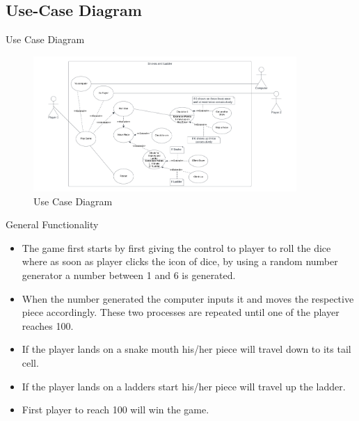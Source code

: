 \documentclass{beamer}
\begin{document}
\subsection{Use-Case Diagram}
\begin{frame}{Use Case Diagram}
    \begin{figure}
        \centering
        \includegraphics[width = 10cm]{images/Use Case.png}
        \caption{Use Case Diagram}
    \end{figure}
\end{frame}
\begin{frame}{General Functionality}
    \begin{itemize}
        \item The game first starts by first giving the control to player to roll the dice where as soon as player clicks the icon of dice, by using a random number generator a number between 1 and 6 is generated.
        \item When the number generated the computer inputs it and moves the respective piece accordingly. These two processes are repeated until one of the player reaches 100.
        \item If the player lands on a snake mouth his/her piece will travel down to its tail cell.
        \item If the player lands on a ladders start his/her piece will travel up the ladder.
        \item First player to reach 100 will win the game.
    \end{itemize}
\end{frame}
\end{document}
